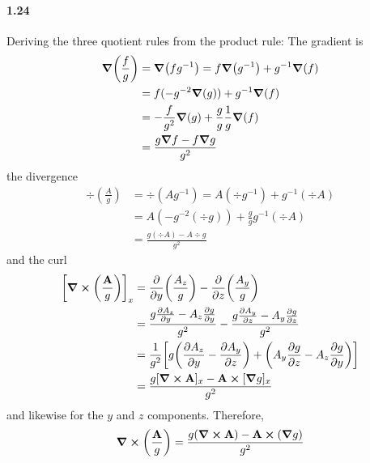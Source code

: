 \documentclass[../main.tex]{subfiles}
\begin{document}
\paragraph{1.24}
Deriving the three quotient rules from the product rule: The gradient is
\begin{align*}
    \grad(\frac{f}{g}) &= \grad(f g^{-1}) = f \grad(g^{-1}) + g^{-1} \grad(f) \\
    &= f (-g^{-2} \grad(g)) + g^{-1} \grad(f) \\
    &= -\frac{f}{g^2} \grad(g) + \frac{g}{g} \frac{1}{g} \grad(f)  \\
    &= \frac{g\grad{f} - f\grad{g}}{g^2}
\end{align*}
the divergence
\begin{align*}
    \div(\frac{A}{g}) &= \div(A g^{-1}) = A (\div g^{-1}) + g^{-1} (\div{A}) \\
    &= A (-g^{-2} (\div{g})) + \frac{g}{g} g^{-1} (\div{A}) \\
    &= \frac{g(\div{A}) - A\div{g}}{g^2}
\end{align*}
and the curl
\begin{align*}
    \qt[\curl(\frac{\vb{A}}{g})]_x &= \pdv{y} \qt(\frac{A_z}{g}) - \pdv{z} \qt(\frac{A_y}{g}) \\
    &= \frac{g\pdv{A_z}{y} - A_z \pdv{g}{y}}{g^2} - \frac{g\pdv{A_y}{z} - A_y \pdv{g}{z}}{g^2} \\
    &= \frac{1}{g^2} \qt[g \qt(\pdv{A_z}{y} - \pdv{A_y}{z})
        + \qt(A_y \pdv{g}{z} - A_z \pdv{g}{y})] \\
    &= \frac{g[\curl{\vb{A}}]_x - \vb{A} \cp [\grad{g}]_x}{g^2}
\end{align*}
and likewise for the $y$ and $z$ components. Therefore,
\begin{align*}
    \curl(\frac{\vb{A}}{g}) = \frac{g(\curl{\vb{A}})- \vb{A} \cp (\grad{g})}{g^2}
\end{align*}
\end{document}
